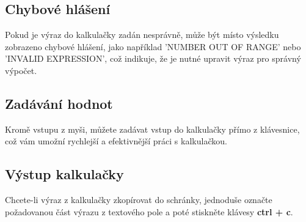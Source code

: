 \documentclass[a4paper, 11pt]{article}
\begin{document}
    \subsection*{Chybové hlášení}
     Pokud je výraz do kalkulačky zadán nesprávně, může být místo výsledku zobrazeno chybové hlášení, jako například 'NUMBER OUT OF RANGE' nebo 'INVALID EXPRESSION', což indikuje, že je nutné upravit výraz pro správný výpočet. 
    \subsection*{Zadávání hodnot}
    Kromě vstupu z myši, můžete zadávat vstup do kalkulačky přímo z klávesnice, což vám umožní rychlejší a efektivnější práci s kalkulačkou. 
    \subsection*{Výstup kalkulačky}
    Chcete-li výraz z kalkulačky zkopírovat do schránky, jednoduše označte požadovanou část výrazu z textového pole a poté stiskněte klávesy \textbf{ctrl + c}.
\end{document}
